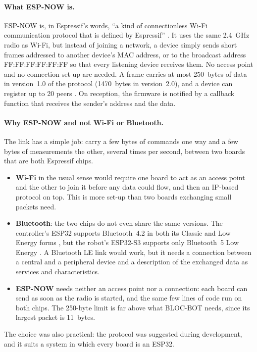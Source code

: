 \paragraph{What ESP-NOW is.} ESP-NOW is, in Espressif's words, ``a kind of
connectionless Wi-Fi communication protocol that is defined by Espressif''
\cite{espnow_idf}. It uses the same 2.4~GHz radio as Wi-Fi, but instead of joining a
network, a device simply sends short frames addressed to another device's MAC address,
or to the broadcast address FF:FF:FF:FF:FF:FF so that every listening device receives
them. No access point and no connection set-up are needed. A frame carries at most
250~bytes of data in version~1.0 of the protocol (1470~bytes in version~2.0), and a device
can register up to 20 peers \cite{espnow_idf}. On reception, the firmware is notified by a
callback function that receives the sender's address and the data.

\paragraph{Why ESP-NOW and not Wi-Fi or Bluetooth.} The link has a simple job: carry a few
bytes of commands one way and a few bytes of measurements the other, several times per
second, between two boards that are both Espressif chips.
\begin{itemize}
  \item \textbf{Wi-Fi} in the usual sense would require one board to act as an access
        point and the other to join it before any data could flow, and then an
        IP-based protocol on top. This is more set-up than two boards exchanging small
        packets need.
  \item \textbf{Bluetooth}: the two chips do not even share the same versions. The
        controller's ESP32 supports Bluetooth~4.2 in both its Classic and Low Energy
        forms \cite{esp32_datasheet}, but the robot's ESP32-S3 supports only Bluetooth~5
        Low Energy \cite{esp32s3_datasheet}. A Bluetooth LE link would work, but it needs
        a connection between a central and a peripheral device and a description of the
        exchanged data as services and characteristics.
  \item \textbf{ESP-NOW} needs neither an access point nor a connection: each board can
        send as soon as the radio is started, and the same few lines of code run on both
        chips. The 250-byte limit is far above what BLOC-BOT needs, since its largest
        packet is 11~bytes.
\end{itemize}
The choice was also practical: the protocol was suggested during development, and
it suits a system in which every board is an ESP32.


